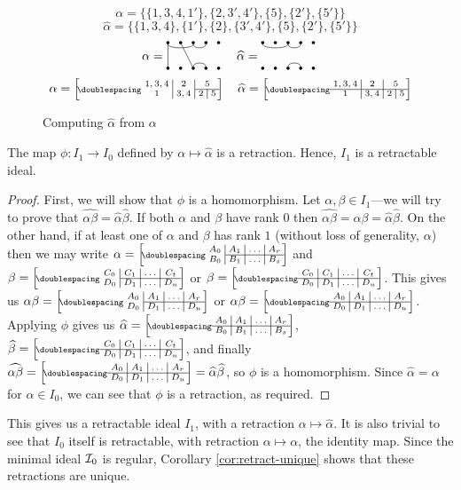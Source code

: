 \begin{figure}[h]
  \centering
  $$\alpha = \big\{
    \{1,3,4,1'\}, \{2,3',4'\}, \{5\}, \{2'\}, \{5'\}
  \big\}$$
  $$\widehat\alpha = \big\{
    \{1,3,4\}, \{1'\}, \{2\}, \{3',4'\}, \{5\}, \{2'\}, \{5'\}
  \big\}$$
  $$\alpha = \bipartdiag{\tv11\tc13\tc34 \tv23\bc34} \quad
  \widehat\alpha = \bipartdiag{\tc13\tc34 \bc34}$$
  $$\alpha = \bipart{c|c|c|c}{3-4}{1,3,4 & 2 & \mc2c5}{1 & 3,4 & 2 & 5} \quad
  \widehat\alpha = \bipart{c|c|c|c}{1-4}{1,3,4 & 2 & \mc2c5}{1 & 3,4 & 2 & 5}$$
  \caption{Computing $\widehat\alpha$ from $\alpha$}
  \label{fig:hat}
\end{figure}

\begin{proposition}
  \label{prop:hat-retraction}
  The map $\phi: I_1 \to I_0$ defined by $\alpha \mapsto \widehat\alpha$ is a
  retraction.  Hence, $I_1$ is a retractable ideal.
  \begin{proof}
    First, we will show that $\phi$ is a homomorphism.  Let
    $\alpha,\beta \in I_1$---we will try to prove that
    $\widehat{\alpha\beta} = \widehat\alpha \widehat\beta$.  If both $\alpha$
    and $\beta$ have rank $0$ then
    $\widehat{\alpha\beta} = \alpha\beta = \widehat\alpha \widehat\beta$.  On
    the other hand, if at least one of $\alpha$ and $\beta$ has rank $1$ (without
    loss of generality, $\alpha$) then we may write
    $\alpha = \bipart{c|c|c|c}{2-4}{A_0&A_1&\ldots&A_r}{B_0&B_1&\ldots&B_s}$ and
    $\beta = \bipart{c|c|c|c}{2-4}{C_0&C_1&\ldots&C_t}{D_0&D_1&\ldots&D_u}$ or
    $\beta = \bipart{c|c|c|c}{1-4}{C_0&C_1&\ldots&C_t}{D_0&D_1&\ldots&D_u}$.
    This gives us
    $\alpha\beta =
    \bipart{c|c|c|c}{2-4}{A_0&A_1&\ldots&A_r}{D_0&D_1&\ldots&D_u}$ or
    $\alpha\beta =
    \bipart{c|c|c|c}{1-4}{A_0&A_1&\ldots&A_r}{D_0&D_1&\ldots&D_u}$.  Applying
    $\phi$ gives us
    $\widehat\alpha =
    \bipart{c|c|c|c}{1-4}{A_0&A_1&\ldots&A_r}{B_0&B_1&\ldots&B_s}$,
    $\widehat\beta =
    \bipart{c|c|c|c}{1-4}{C_0&C_1&\ldots&C_t}{D_0&D_1&\ldots&D_u}$, and finally
    $\widehat{\alpha\beta} =
    \bipart{c|c|c|c}{1-4}{A_0&A_1&\ldots&A_r}{D_0&D_1&\ldots&D_u} =
    \widehat\alpha \widehat\beta$, so $\phi$ is a homomorphism.  Since
    $\widehat\alpha = \alpha$ for $\alpha \in I_0$, we can see that $\phi$ is a
    retraction, as required.
  \end{proof}
\end{proposition}

This gives us a retractable ideal $I_1$, with a retraction
$\alpha \mapsto \widehat\alpha$.  It is also trivial to see that $I_0$ itself is
retractable, with retraction $\alpha \mapsto \alpha$, the identity map.  Since
the minimal ideal $\mathcal{I}_0$ is regular, Corollary \ref{cor:retract-unique} shows
that these retractions are unique.


